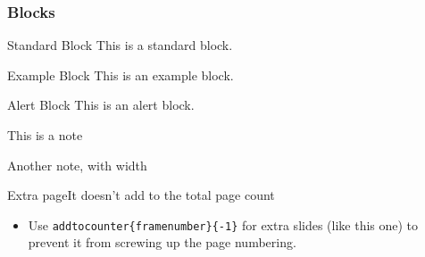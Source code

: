 \documentclass[11 pt,t]{beamer}
\begin{document}
\begin{frame}
    \frametitle{Blocks}

    \begin{block}{Standard Block}
        This is a standard block.
    \end{block}

    \begin{exampleblock}{Example Block}
        This is an example block.
    \end{exampleblock}

    \begin{alertblock}{Alert Block}
        This is an alert block.
    \end{alertblock}

    \begin{noteblock}
        This is a note
    \end{noteblock}

    \begin{noteblock}[wd=5cm]
        Another note, with width
    \end{noteblock}

\end{frame}


\addtocounter{framenumber}{-1}
\begin{frame}[c]{Extra page}{It doesn't add to the total page count}
    \begin{itemize}
        \item Use \alert{\texttt{addtocounter\{framenumber\}\{-1\}}} for extra slides (like this one) to prevent it from screwing up the page numbering.
    \end{itemize}
\end{frame}
\end{document}

